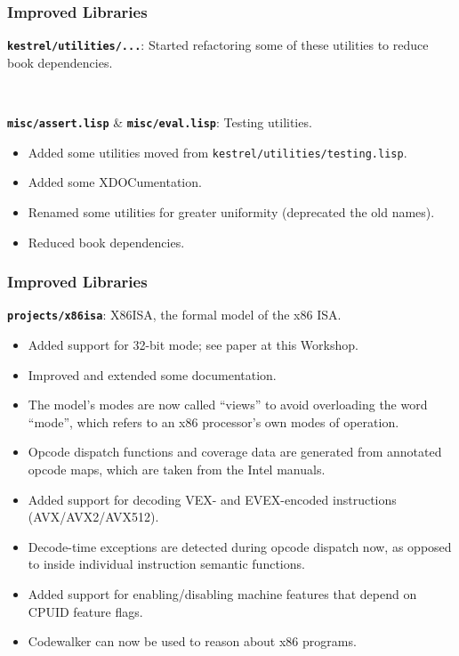\documentclass{beamer}
\newcommand{\code}[1]{\texttt{#1}}
\newcommand{\bookpath}[1]{\textbf{\code{#1}}}
\newcommand{\implibtitle}{\frametitle{Improved Libraries}}
\begin{document}

\begin{frame}

\implibtitle

\bookpath{kestrel/utilities/...}:
Started refactoring some of these utilities to reduce book dependencies.

\

\bookpath{misc/assert.lisp} \& \bookpath{misc/eval.lisp}:
Testing utilities.
\begin{itemize}
\item
Added some utilities moved from \code{kestrel/utilities/testing.lisp}.
\item
Added some XDOCumentation.
\item
Renamed some utilities for greater uniformity
(deprecated the old names).
\item
Reduced book dependencies.
\end{itemize}

\end{frame}


\begin{frame}

\implibtitle

\bookpath{projects/x86isa}:
X86ISA, the formal model of the x86 ISA.
\begin{itemize}
\item
Added support for 32-bit mode; see paper at this Workshop.
\item
Improved and extended some documentation.
\item
The model's modes are now called ``views'' to avoid overloading the
word ``mode'', which refers to an x86 processor's own modes of
operation.
\item
Opcode dispatch functions and coverage data are generated from
annotated opcode maps, which are taken from the Intel manuals.
\item
Added support for decoding VEX- and EVEX-encoded instructions
(AVX/AVX2/AVX512).
\item
Decode-time exceptions are detected during opcode dispatch now, as
opposed to inside individual instruction semantic functions.
\item 
Added support for enabling/disabling machine features that depend on
CPUID feature flags.
\item
Codewalker can now be used to reason about x86 programs.
\end{itemize}

\end{frame}
\end{document}
